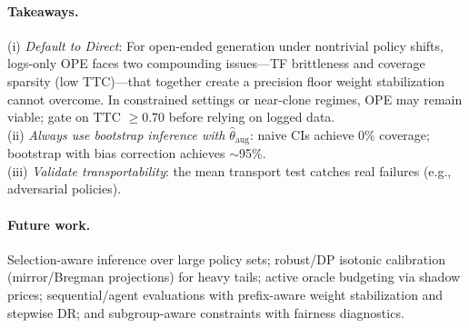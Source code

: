 \paragraph{Takeaways.}
(i) \emph{Default to Direct}: For open-ended generation under nontrivial policy shifts, logs-only OPE faces two compounding issues---TF brittleness and coverage sparsity (low TTC)---that together create a precision floor weight stabilization cannot overcome. In constrained settings or near-clone regimes, OPE may remain viable; gate on TTC $\geq 0.70$ before relying on logged data.\\
(ii) \emph{Always use bootstrap inference with $\hat\theta_{\mathrm{aug}}$}: naive CIs achieve 0\% coverage; bootstrap with bias correction achieves ${\sim}$95\%.\\
(iii) \emph{Validate transportability}: the mean transport test catches real failures (e.g., adversarial policies).

\paragraph{Future work.}
Selection-aware inference over large policy sets; robust/DP isotonic calibration (mirror/Bregman projections) for heavy tails; active oracle budgeting via shadow prices; sequential/agent evaluations with prefix-aware weight stabilization and stepwise DR; and subgroup-aware constraints with fairness diagnostics.
